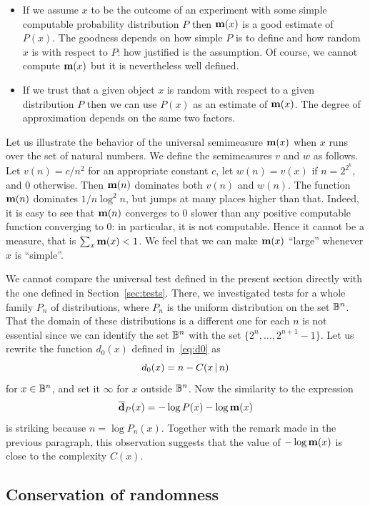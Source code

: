\begin{itemize}

 \item If we assume $x$ to be the outcome of an experiment with some
simple computable probability distribution $P$ then $\mathbf{m}(x)$ is a good
estimate of $P(x)$.
The goodness depends on how simple $P$ is to
define and how random $x$ is with respect to $P$: how justified
is the assumption.
Of course, we cannot compute $\mathbf{m}(x)$ but it is
nevertheless well defined.

 \item If we trust that a given object $x$ is random with respect to a
given distribution $P$ then we can use $P(x)$ as an estimate of $\mathbf{m}(x)$.
The degree of approximation depends on the same two factors.

 \end{itemize}

Let us illustrate the behavior of the universal semimeasure $\mathbf{m}(x)$
when $x$ runs over the set of natural numbers.
We define the
semimeasures $v$ and $w$ as follows.
Let $v(n)=c/n^2$ for an
appropriate constant $c$, let $w(n)=v(x)$ if $n=2^{2^k}$, and 0
otherwise.
Then $\mathbf{m}(n)$ dominates both $v(n)$ and $w(n)$.
The function $\mathbf{m}(n)$ dominates $1/n\log^2n$, but jumps at many places
higher than that.
Indeed, it is easy to see that $\mathbf{m}(n)$ converges to
0 slower than any positive computable function converging to 0: in
particular, it is not computable.
Hence it cannot be a measure, that is $\sum_{x} \mathbf{m}(x) < 1$.
We feel that we can make $\mathbf{m}(x)$ ``large'' whenever $x$ is ``simple''.

We cannot compare the universal test defined in the present section
directly with the one defined in Section~\ref{sec:tests}.
There, we investigated tests for a whole family $P_{n}$ of
distributions, where $P_{n}$ is the uniform distribution on the set
$\mathbb{B}^{n}$.
That the domain of these distributions is a different one for
each $n$ is not essential since we can identify the set $\mathbb{B}^{n}$ with
the set $\{2^{n},\ldots,2^{n+1}-1\}$.
Let us rewrite the function $d_{0}(x)$ defined in~\eqref{eq:d0} as
 \[
 	d_{0}(x) = n - C(x \,\vert\, n)
 \]
 for $x \in \mathbb{B}^{n}$, and set it $\infty$ for $x$ outside $\mathbb{B}^{n}$. Now the
similarity to the expression
 \[
  	\overline{\mathbf{d}}_{P}(x) = -\log P(x) - \log \mathbf{m}(x)
 \]
  is striking because $n = \log P_{n}(x)$.
Together with the remark
made in the previous paragraph, this observation suggests that the
value of $-\log \mathbf{m}(x)$ is close to the complexity $C(x)$.

\subsection{Conservation of randomness}

